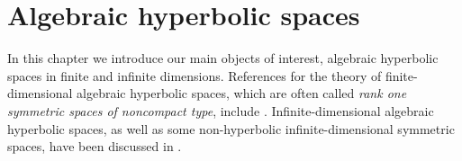 

\chapter{Algebraic hyperbolic spaces}
\label{sectionROSSONCTs}

In this chapter we introduce our main objects of interest, algebraic hyperbolic spaces in finite and infinite dimensions. References for the theory of finite-dimensional algebraic hyperbolic spaces, which are often called \emph{rank one symmetric spaces of noncompact type}, include \cite{BridsonHaefliger,CFKP,MackayTyson}. Infinite-dimensional algebraic hyperbolic spaces, as well as some non-hyperbolic infinite-dimensional symmetric spaces, have been discussed in \cite{Duchesne}.


